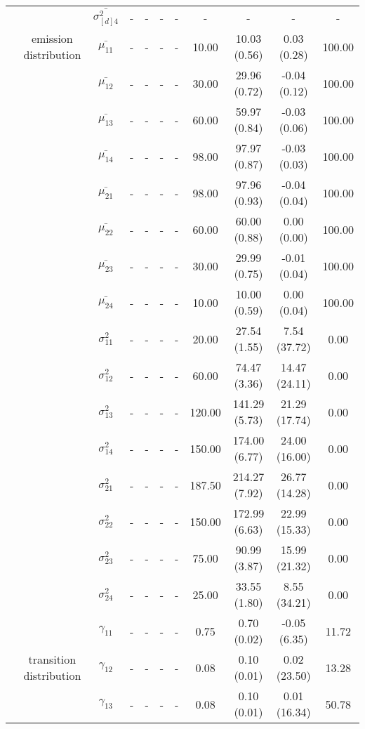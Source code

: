 \begin{table}[h]
{\begin{tabular}{ccccccccccc}
 &  & $\bar{\sigma^2_{[d]4}}$ & - & - & - & - & - & - & - & - \\
 & emission distribution & $\bar{\mu_{11}}$ & - & - & - & - & 10.00 & 10.03 (0.56) & 0.03 (0.28) & 100.00 \\
 & \multirow{15}{*}{} & $\bar{\mu_{12}}$ & - & - & - & - & 30.00 & 29.96 (0.72) & -0.04 (0.12) & 100.00 \\
 &  & $\bar{\mu_{13}}$ & - & - & - & - & 60.00 & 59.97 (0.84) & -0.03 (0.06) & 100.00 \\
 &  & $\bar{\mu_{14}}$ & - & - & - & - & 98.00 & 97.97 (0.87) & -0.03 (0.03) & 100.00 \\
 &  & $\bar{\mu_{21}}$ & - & - & - & - & 98.00 & 97.96 (0.93) & -0.04 (0.04) & 100.00 \\
 &  & $\bar{\mu_{22}}$ & - & - & - & - & 60.00 & 60.00 (0.88) & 0.00 (0.00) & 100.00 \\
 &  & $\bar{\mu_{23}}$ & - & - & - & - & 30.00 & 29.99 (0.75) & -0.01 (0.04) & 100.00 \\
 &  & $\bar{\mu_{24}}$ & - & - & - & - & 10.00 & 10.00 (0.59) & 0.00 (0.04) & 100.00 \\
 &  & $\sigma^2_{11}$ & - & - & - & - & 20.00 & 27.54 (1.55) & 7.54 (37.72) & 0.00 \\
 &  & $\sigma^2_{12}$ & - & - & - & - & 60.00 & 74.47 (3.36) & 14.47 (24.11) & 0.00 \\
 &  & $\sigma^2_{13}$ & - & - & - & - & 120.00 & 141.29 (5.73) & 21.29 (17.74) & 0.00 \\
 &  & $\sigma^2_{14}$ & - & - & - & - & 150.00 & 174.00 (6.77) & 24.00 (16.00) & 0.00 \\
 &  & $\sigma^2_{21}$ & - & - & - & - & 187.50 & 214.27 (7.92) & 26.77 (14.28) & 0.00 \\
 &  & $\sigma^2_{22}$ & - & - & - & - & 150.00 & 172.99 (6.63) & 22.99 (15.33) & 0.00 \\
 &  & $\sigma^2_{23}$ & - & - & - & - & 75.00 & 90.99 (3.87) & 15.99 (21.32) & 0.00 \\
 &  & $\sigma^2_{24}$ & - & - & - & - & 25.00 & 33.55 (1.80) & 8.55 (34.21) & 0.00 \\
 & \multirow{16}{*}{transition distribution} & $\gamma_{11}$ & - & - & - & - & 0.75 & 0.70 (0.02) & -0.05 (6.35) & 11.72 \\
 &  & $\gamma_{12}$ & - & - & - & - & 0.08 & 0.10 (0.01) & 0.02 (23.50) & 13.28 \\
 &  & $\gamma_{13}$ & - & - & - & - & 0.08 & 0.10 (0.01) & 0.01 (16.34) & 50.78 \\

\end{tabular}}
\end{table}

